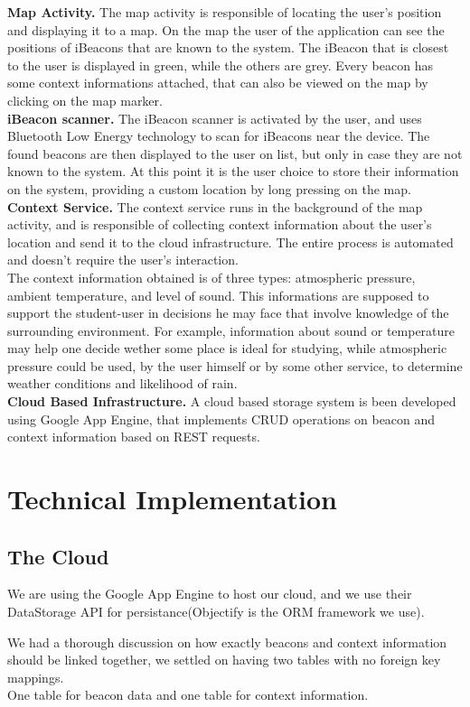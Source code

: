 \documentclass{sigchi}
\begin{document}
\textbf{Map Activity.} The map activity is responsible of locating the user's position and displaying it to a map.  On the map the user of the application can see the positions of iBeacons that are known to the system. The iBeacon that is closest to the user is displayed in green, while the others are grey. Every beacon has some context informations attached, that can also be viewed on the map by clicking on the map marker.\\
\textbf{iBeacon scanner.} The iBeacon scanner is activated by the user, and uses Bluetooth Low Energy technology to scan for iBeacons near the device. The found beacons are then displayed to the user on list, but only in case they are not known to the system. At this point it is the user choice to store their information on the system, providing a custom location by long pressing on the map. \\
\textbf{Context Service.} The context service runs in the background of the map activity, and is responsible of collecting context information about the user's location and send it to the cloud infrastructure. The entire process is automated and doesn't require the user's interaction. \\
The context information obtained is of three types: atmospheric pressure, ambient temperature, and level of sound. This informations are supposed to support the student-user in decisions he may face that involve knowledge of the surrounding environment. For example, information about sound or temperature may help one decide wether some place is ideal for studying, while atmospheric pressure could be used, by the user himself or by some other service, to  determine weather conditions and likelihood of rain. \\
\textbf{Cloud Based Infrastructure. }  A cloud based storage system is been developed using Google App Engine, that implements CRUD operations on beacon and context information based on REST requests.

\section{Technical Implementation}
\subsection{The Cloud}
We are using the Google App Engine to host our cloud, and we use their DataStorage API for persistance(Objectify is the ORM framework we use).

We had a thorough discussion on how exactly beacons and context information should be linked together, we settled on having two tables with no foreign key mappings.\\
One table for beacon data and one table for context information.\\
\end{document}
